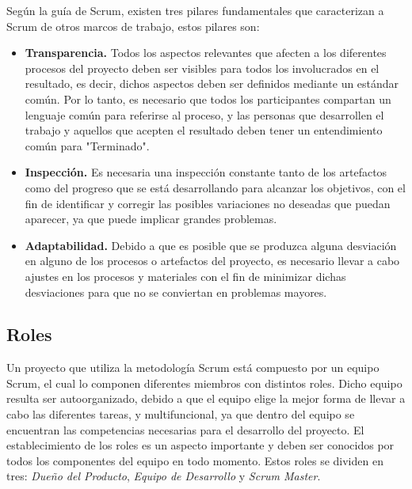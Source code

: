 Según la guía de Scrum, existen tres pilares fundamentales que caracterizan a Scrum de otros marcos de trabajo, estos pilares son:

\begin{itemize}
	\item \textbf{Transparencia.} Todos los aspectos relevantes que afecten a los diferentes procesos del proyecto deben ser visibles para todos los involucrados en el resultado, es decir, dichos aspectos deben ser definidos mediante un estándar común. Por lo tanto, es necesario que todos los participantes compartan un lenguaje común para referirse al proceso, y las personas que desarrollen el trabajo y aquellos que acepten el resultado deben tener un entendimiento común para "Terminado".
	\item \textbf{Inspección.} Es necesaria una inspección constante tanto de los artefactos como del progreso que se está desarrollando para alcanzar los objetivos, con el fin de identificar y corregir las posibles variaciones no deseadas que puedan aparecer, ya que puede implicar grandes problemas.
	\item \textbf{Adaptabilidad.} Debido a que es posible que se produzca alguna desviación en alguno de los procesos o artefactos del proyecto, es necesario llevar a cabo ajustes en los procesos y materiales con el fin de minimizar dichas desviaciones para que no se conviertan en problemas mayores.
\end{itemize} 

\subsection{Roles}
\label{sec:Roles}

Un proyecto que utiliza la metodología Scrum está compuesto por un equipo Scrum, el cual lo componen diferentes miembros con distintos roles. Dicho equipo resulta ser autoorganizado, debido a que el equipo elige la mejor forma de llevar a cabo las diferentes tareas, y multifuncional, ya que dentro del equipo se encuentran las competencias necesarias para el desarrollo del proyecto. El establecimiento de los roles es un aspecto importante y deben ser conocidos por todos los componentes del equipo en todo momento. Estos roles se dividen en tres: \emph{Dueño del Producto}, \emph{Equipo de Desarrollo} y \emph{Scrum Master}.

